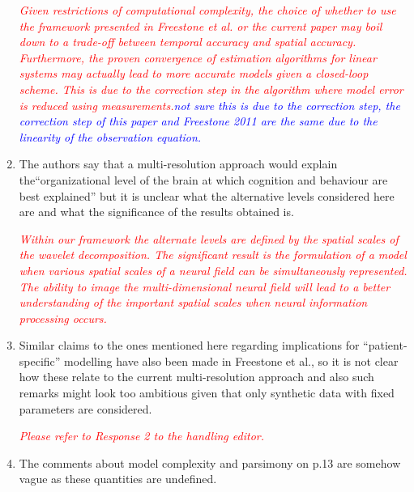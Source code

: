 \documentclass{article}
\newcommand{\dean}[1]{\textcolor{red}{#1}}
\newcommand{\parham}[1]{\textcolor{blue}{#1}}
\begin{document}
\begin{enumerate}
\emph{\dean{Given restrictions of computational complexity, the choice of whether to use the framework presented in Freestone et al. or the current paper may boil down to a trade-off between temporal accuracy and spatial accuracy. Furthermore, the proven convergence of estimation algorithms for linear systems may actually lead to more accurate models given a closed-loop scheme. This is due to the correction step in the algorithm where model error is reduced using measurements.\parham{not sure this is due to the correction step, the correction step of this paper and Freestone 2011 are the same due to the linearity of the observation equation.}}}
				

        \item The authors say that a multi-resolution approach would explain the``organizational level of the brain at which cognition and behaviour are best explained'' but it is unclear what the alternative levels considered here are and what the significance of the results obtained is.

\dean{\emph{Within our framework the alternate levels are defined by the spatial scales of the wavelet decomposition. The significant result is the formulation of a model when various spatial scales of a neural field can be simultaneously represented. The ability to image the multi-dimensional neural field will lead to a better understanding of the important spatial scales when neural information processing occurs.  }}

				\item Similar claims to the ones mentioned here regarding  implications for ``patient-specific'' modelling have also been made in Freestone et al., so it is not clear how these relate to the current multi-resolution approach and also such remarks might look too ambitious given that only synthetic data with fixed parameters are considered.
				
				\dean{\emph{Please refer to Response 2 to the handling editor.}}
				
				\item The comments about model complexity and parsimony on p.13 are somehow vague as these quantities are undefined.
				
				

\end{enumerate}
\end{document}
